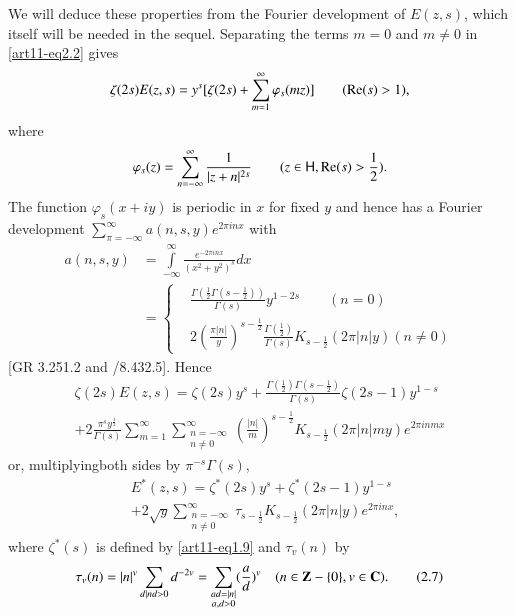 We will deduce these properties from the Fourier development of $E(z,s)$, which itself will be needed in the sequel. Separating the terms $m=0$ and $m \neq 0$ in \eqref{art11-eq2.2} gives 
$$
\zeta(2s) E (z,s) = y^s [\zeta (2s) + \sum\limits^\infty_{m=1} \varphi_s (mz)] \qquad (\operatorname{Re} (s) > 1), 
$$
where 
$$
\varphi_s (z) = \sum\limits^\infty_{n = - \infty} \frac{1}{|z+n|^{2s}} \qquad (z \in \mathsf{H}, \operatorname{Re} (s) > \frac{1}{2}).
$$
The function $\varphi_s(x + iy)$ is periodic in $x$ for fixed $y$ and hence has a Fourier development $\sum\limits^\infty_{\pi = - \infty} a(n, s,y) e^{2 \pi in x}$ with 
\begin{align*}
a(n, s, y) & = \int\limits^\infty_{-\infty} \frac{e^{-2 \pi in x}}{(x^2 + y^2)^s} dx\\
& = \left\{ 
\begin{aligned}
& \frac{\Gamma (\frac{1}{2} \Gamma (s - \frac{1}{2}))}{\Gamma (s)} y^{1-2s} \qquad (n=0)\\
& 2 \left(\frac{\pi |n|}{y} \right)^{s-\frac{1}{2}} \frac{\Gamma (\frac{1}{2})}{\Gamma (s)} K_{s - \frac{1}{2}} (2 \pi |n| y) (n \neq 0)
\end{aligned}
\right.
\end{align*}
[GR 3.251.2 and /8.432.5]. Hence 
\begin{gather*}
\zeta (2 s) E (z, s) = \zeta (2s) y^s  + \frac{\Gamma (\frac{1}{2}) \Gamma (s - \frac{1}{2})}{\Gamma (s)} \zeta (2 s - 1) y^{1-s} \\
 + 2 \frac{\pi^s y^{\frac{1}{2}}}{\Gamma (s)} \sum\limits^\infty_{m=1} \sum\limits^\infty_{\substack{n = - \infty\\ n \neq 0}} \left(\frac{|n|}{m} \right)^{s  - \frac{1}{2}} K_{s - \frac{1}{2}} (2 \pi |n| my) e^{2 \pi in m x}
\end{gather*}
or, multiplying\pageoriginale both sides by $\pi^{-s} \Gamma (s)$,
\begin{align*}
& E^\ast (z,s) = \zeta^\ast (2s) y^s + \zeta^\ast (2s -1) y^{1-s} \tag{2.6}\label{art11-eq2.6}\\
& + 2 \sqrt{y} \sum\limits^\infty_{\substack{n = - \infty\\ n \neq 0}} \tau_{s - \frac{1}{2}} K_{s - \frac{1}{2}} (2 \pi |n|y)e^{2 \pi in x}, 
\end{align*}
where $\zeta^\ast(s)$ is defined by \eqref{art11-eq1.9} and $\tau_v (n)$ by 
\begin{equation*}
\tau_v (n) = |n|^v \sum\limits_{\substack{d|n}\\d >0} d^{-2v} = \sum\limits_{\substack{ad = |n|\\ a, d>0}} (\frac{a}{d})^v  \quad (n \in \mathbf{Z} -\{0\}, v \in \mathbf{C}). \tag{2.7}\label{art11-eq2.7}
\end{equation*}
